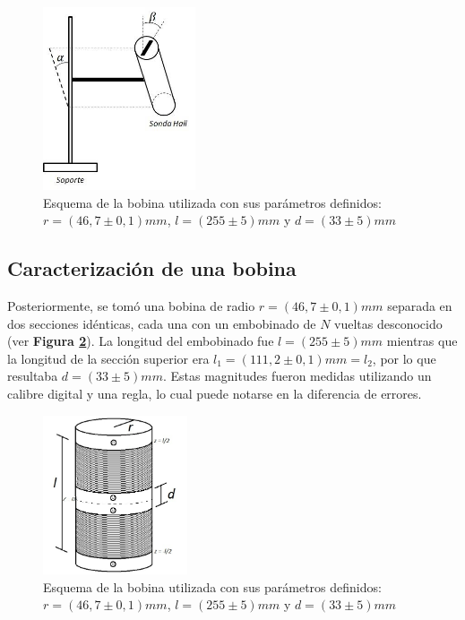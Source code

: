\documentclass[11pt,a4paper]{article}
\begin{document}
\begin{figure}[h!]
\centering
   \includegraphics[width=0.4\textwidth]{Terrestre}
   \caption{Esquema de la bobina utilizada con sus parámetros definidos: $r = (46,7 \pm 0,1)mm$, $l = (255 \pm 5)mm$ y $d = (33 \pm 5)mm$}  
   \label{fig:terrestre}
\end{figure}

\newpage

\subsection{Caracterización de una bobina}

Posteriormente, se tomó una bobina de radio $r = (46,7 \pm 0,1)mm$ separada en dos secciones idénticas, cada una con un embobinado de $N$ vueltas desconocido (ver \textbf{Figura \ref{fig:bobina}}). La longitud del embobinado fue $l = (255 \pm 5)mm$ mientras que la longitud de la sección superior era $l_1 = (111,2 \pm 0,1)mm = l_2$, por lo que resultaba $d = (33 \pm 5)mm$. Estas magnitudes fueron medidas utilizando un calibre digital y una regla, lo cual puede notarse en la diferencia de errores. 

\begin{figure}[h!]
\centering
   \includegraphics[width=0.38\textwidth]{Bobinaa}
   \caption{Esquema de la bobina utilizada con sus parámetros definidos: $r = (46,7 \pm 0,1)mm$, $l = (255 \pm 5)mm$ y $d = (33 \pm 5)mm$}  
   \label{fig:bobina}
\end{figure}
\end{document}
